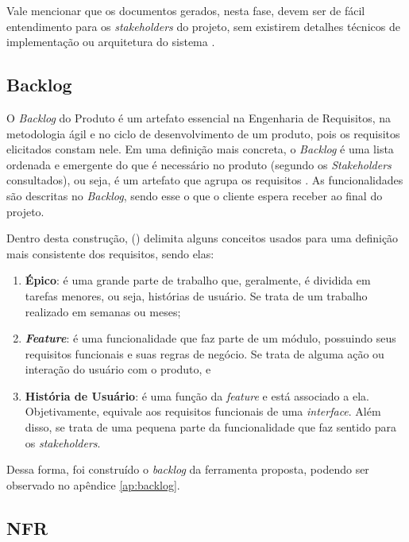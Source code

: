 Vale mencionar que os documentos gerados, nesta fase, devem ser de fácil entendimento para os \textit{stakeholders} do projeto, sem existirem detalhes técnicos de implementação ou arquitetura do sistema \cite{Sommerville10}.

\subsection{Backlog}

\label{sec:backlog}

O \textit{Backlog} do Produto é um artefato essencial na Engenharia de Requisitos, na metodologia ágil e no ciclo de desenvolvimento de um produto, pois os requisitos elicitados constam nele. Em uma definição mais concreta, o \textit{Backlog} é uma lista ordenada e emergente do que é necessário no produto (segundo os \textit{Stakeholders} consultados), ou seja, é um artefato que agrupa os requisitos \cite{carolipaulo2021}. As funcionalidades são descritas no \textit{Backlog}, sendo esse o que o cliente espera receber ao final do projeto.

Dentro desta construção,  (\citeyear{carolipaulo2021}) delimita alguns conceitos usados para uma definição mais consistente dos requisitos, sendo elas:

\begin{enumerate}
    \item \label{tp:epico} \textbf{Épico}: é uma grande parte de trabalho que, geralmente, é dividida em tarefas menores, ou seja, histórias de usuário. Se trata de um trabalho realizado em semanas ou meses;
    \item \label{tp:feature} \textit{\textbf{Feature}}: é uma funcionalidade que faz parte de um módulo, possuindo seus requisitos funcionais e suas regras de negócio. Se trata de alguma ação ou interação do usuário com o produto, e
    \item \label{tp:us} \textbf{História de Usuário}: é uma função da \textit{feature} e está associado a ela. Objetivamente, equivale aos requisitos funcionais de uma \textit{interface}. Além disso, se trata de uma pequena parte da funcionalidade que faz sentido para os \textit{stakeholders}.
\end{enumerate}

Dessa forma, foi construído o \textit{backlog} da ferramenta proposta, podendo ser observado no apêndice \ref{ap:backlog}.

\subsection{NFR}

